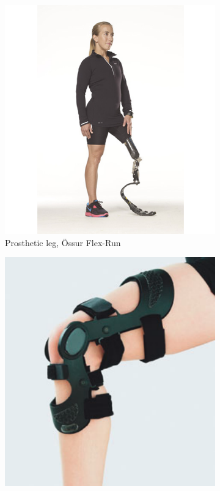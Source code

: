 \begin{figure}[h]
	\centering
    \begin{subfigure}[b]{0.3\textwidth}
        \includegraphics[width=\textwidth]{figures/prosthetic_leg.pdf}
        \caption{Prosthetic leg, Össur Flex-Run}
        \label{fig:prosthetic_leg}
    \end{subfigure}
    \centering
    \begin{subfigure}[b]{0.3\textwidth}
        \includegraphics[width=\textwidth]{figures/orthotic_leg.pdf}

\end{subfigure}
\end{figure}
